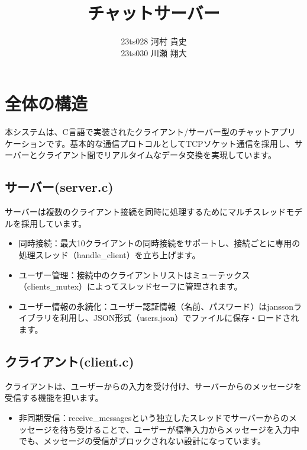 \documentclass{article}
\title{チャットサーバー}
\author{
23ts028 河村 貴史\\
23ts030 川瀬 翔大
}
\date{}
\begin{document}
\maketitle
\section{全体の構造}
本システムは、C言語で実装されたクライアント/サーバー型のチャットアプリケーションです。基本的な通信プロトコルとしてTCPソケット通信を採用し、サーバーとクライアント間でリアルタイムなデータ交換を実現しています。
\subsection{サーバー(server.c)}
サーバーは複数のクライアント接続を同時に処理するためにマルチスレッドモデルを採用しています。
\begin{itemize}
    \item 同時接続：最大10クライアントの同時接続をサポートし、接続ごとに専用の処理スレッド（handle\_client）を立ち上げます。
    \item ユーザー管理：接続中のクライアントリストはミューテックス（clients\_mutex）によってスレッドセーフに管理されます。
    \item ユーザー情報の永続化：ユーザー認証情報（名前、パスワード）はjanssonライブラリを利用し、JSON形式（users.json）でファイルに保存・ロードされます。
\end{itemize}
\subsection{クライアント(client.c)}
クライアントは、ユーザーからの入力を受け付け、サーバーからのメッセージを受信する機能を担います。
\begin{itemize}
    \item 非同期受信：receive\_messagesという独立したスレッドでサーバーからのメッセージを待ち受けることで、ユーザーが標準入力からメッセージを入力中でも、メッセージの受信がブロックされない設計になっています。
\end{itemize}
\end{document}
